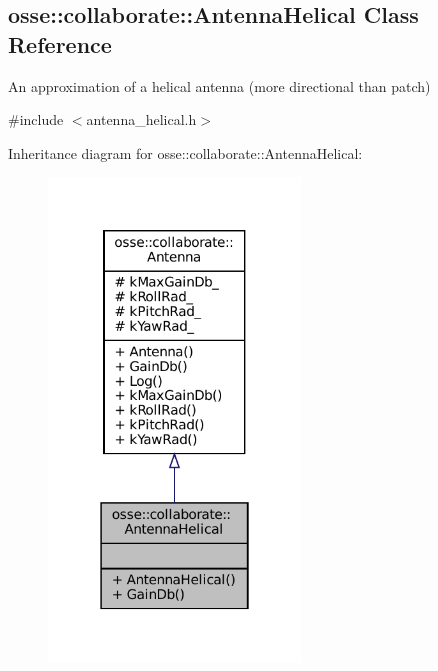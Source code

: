 \hypertarget{classosse_1_1collaborate_1_1_antenna_helical}{}\subsection{osse\+:\+:collaborate\+:\+:Antenna\+Helical Class Reference}
\label{classosse_1_1collaborate_1_1_antenna_helical}


An approximation of a helical antenna (more directional than patch)  




{\ttfamily \#include $<$antenna\+\_\+helical.\+h$>$}



Inheritance diagram for osse\+:\+:collaborate\+:\+:Antenna\+Helical\+:
\nopagebreak
\begin{figure}[H]
\begin{center}
\leavevmode
\includegraphics[width=190pt]{classosse_1_1collaborate_1_1_antenna_helical__inherit__graph}
\end{center}
\end{figure}
